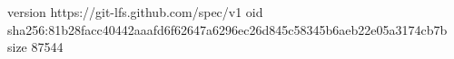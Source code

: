 version https://git-lfs.github.com/spec/v1
oid sha256:81b28facc40442aaafd6f62647a6296ec26d845c58345b6aeb22e05a3174cb7b
size 87544
